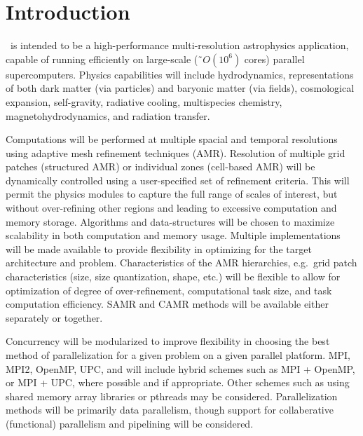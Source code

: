 \documentclass{book}
\begin{document}

\chapter{Introduction} \label{s:intro}

   \cello\ is intended to be a high-performance multi-resolution
   astrophysics application, capable of running efficiently on
   large-scale (\~{\ }$O(10^6)$ cores) parallel supercomputers.
   Physics capabilities will include hydrodynamics, representations of
   both dark matter (via particles) and baryonic matter (via fields),
   cosmological expansion, self-gravity, radiative cooling,
   multispecies chemistry, magnetohydrodynamics, and radiation
   transfer.

   Computations will be performed at multiple spacial and temporal
   resolutions using adaptive mesh refinement techniques (AMR).
   Resolution of multiple grid patches (structured AMR) or individual
   zones (cell-based AMR) will be dynamically controlled using a
   user-specified set of refinement criteria.  This will permit the
   physics modules to capture the full range of scales of interest,
   but without over-refining other regions and leading to excessive
   computation and memory storage.  Algorithms and data-structures will
   be chosen to maximize scalability in both computation and memory
   usage.  Multiple implementations will be made available to provide
   flexibility in optimizing for the target architecture and problem.
   Characteristics of the AMR hierarchies, e.g.~grid patch
   characteristics (size, size quantization, shape, etc.) will be
   flexible to allow for optimization of degree of over-refinement,
   computational task size, and task computation efficiency.  SAMR and
   CAMR methods will be available either separately or together.
   

   Concurrency will be modularized to improve flexibility in choosing
   the best method of parallelization for a given problem on a given
   parallel platform.  MPI, MPI2, OpenMP, UPC, and will include hybrid
   schemes such as MPI + OpenMP, or MPI + UPC, where possible and if
   appropriate.  Other schemes such as using shared memory array
   libraries or pthreads may be considered.  Parallelization methods
   will be primarily data parallelism, though support for
   collaberative (functional) parallelism and pipelining will be
   considered.
\end{document}
